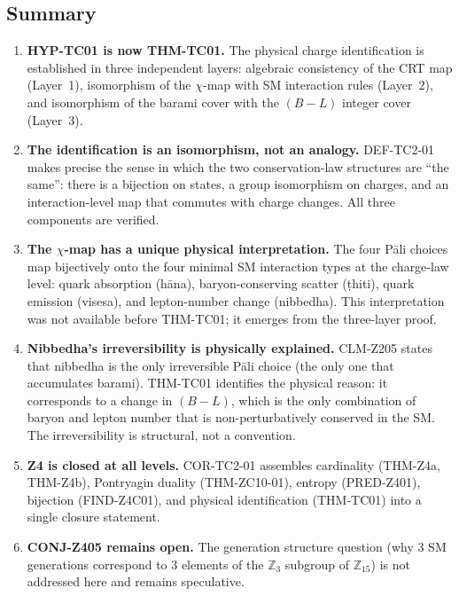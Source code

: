 \documentclass[12pt, a4paper]{article}
\begin{document}
\subsection{Summary}
\label{sec:summary}

\begin{enumerate}[leftmargin=*]

\item \textbf{HYP-TC01 is now THM-TC01.} The physical charge
  identification is established in three independent layers: algebraic
  consistency of the CRT map (Layer~1), isomorphism of the $\chi$-map
  with SM interaction rules (Layer~2), and isomorphism of the barami
  cover with the $(B-L)$ integer cover (Layer~3).

\item \textbf{The identification is an isomorphism, not an analogy.}
  DEF-TC2-01 makes precise the sense in which the two conservation-law
  structures are ``the same'': there is a bijection on states, a group
  isomorphism on charges, and an interaction-level map that commutes
  with charge changes. All three components are verified.

\item \textbf{The $\chi$-map has a unique physical interpretation.}
  The four Pāli choices map bijectively onto the four minimal SM
  interaction types at the charge-law level: quark absorption (hāna),
  baryon-conserving scatter (ṭhiti), quark emission (visesa), and
  lepton-number change (nibbedha). This interpretation was not
  available before THM-TC01; it emerges from the three-layer proof.

\item \textbf{Nibbedha's irreversibility is physically explained.}
  CLM-Z205 states that nibbedha is the only irreversible Pāli choice
  (the only one that accumulates barami). THM-TC01 identifies the
  physical reason: it corresponds to a change in $(B-L)$, which is
  the only combination of baryon and lepton number that is
  non-perturbatively conserved in the SM. The irreversibility is
  structural, not a convention.

\item \textbf{Z4 is closed at all levels.} COR-TC2-01 assembles
  cardinality (THM-Z4a, THM-Z4b), Pontryagin duality (THM-ZC10-01),
  entropy (PRED-Z401), bijection (FIND-Z4C01), and physical
  identification (THM-TC01) into a single closure statement.

\item \textbf{CONJ-Z405 remains open.} The generation structure
  question (why 3 SM generations correspond to 3 elements of the
  $\mathbb{Z}_3$ subgroup of $\mathbb{Z}_{15}$) is not addressed here
  and remains speculative.

\end{enumerate}
\end{document}
